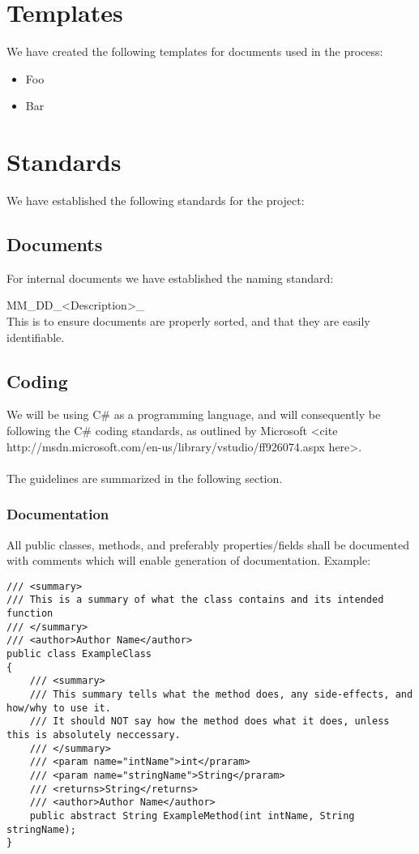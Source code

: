 
\section{Templates}
We have created the following templates for documents used in the process:

\begin{itemize}

\item Foo
\item Bar

\end{itemize}

\section{Standards}
We have established the following standards for the project:

\subsection{Documents}
For internal documents we have established the naming standard:

MM\_DD\_<Description>\_<Version if applicable>
\\
This is to ensure documents are properly sorted, and that they are easily identifiable.



\subsection{Coding}
We will be using C\# as a programming language, and will consequently be following the C\# coding standards, as outlined by Microsoft <cite http://msdn.microsoft.com/en-us/library/vstudio/ff926074.aspx here>.
\\\\
The guidelines are summarized in the following section.\\

\subsubsection{Documentation}
All public classes, methods, and preferably properties/fields shall be documented with comments which will enable generation of documentation. Example:
\begin{lstlisting}
/// <summary>
/// This is a summary of what the class contains and its intended function
/// </summary>
/// <author>Author Name</author>
public class ExampleClass
{
	/// <summary>
	/// This summary tells what the method does, any side-effects, and how/why to use it.
	/// It should NOT say how the method does what it does, unless this is absolutely neccessary.
	/// </summary>
	/// <param name="intName">int</praram>
	/// <param name="stringName">String</praram>
	/// <returns>String</returns>
	/// <author>Author Name</author>
	public abstract String ExampleMethod(int intName, String stringName);
}
\end{lstlisting}

